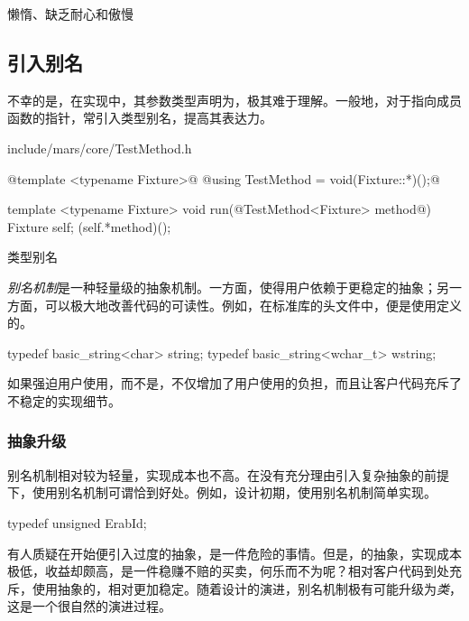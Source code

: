 \begin{content}
\begin{episode}{懒惰、缺乏耐心和傲慢}
\begin{content}
\end{content}
\end{episode}

\subsection{引入别名}

不幸的是，在实现中，其参数类型声明为，极其难于理解。一般地，对于指向成员函数的指针，常引入类型别名，提高其表达力。

\begin{nodiff}{include/mars/core/TestMethod.h}
\begin{c++}
@template <typename Fixture>@
@using TestMethod = void(Fixture::*)();@

template <typename Fixture>
void run(@TestMethod<Fixture> method@) {
  Fixture self;
  (self.*method)();
}
\end{c++}
\end{nodiff}

\begin{episode}{类型别名}
\begin{content}

\emph{别名机制}是一种轻量级的抽象机制。一方面，使得用户依赖于更稳定的抽象；另一方面，可以极大地改善代码的可读性。例如，在标准库的头文件中，便是使用定义的。

\begin{c++}[title={\ttfamily{标准库: std::string与std::wstring}}]
typedef basic_string<char> string;
typedef basic_string<wchar_t> wstring;
\end{c++}

如果强迫用户使用，而不是，不仅增加了用户使用的负担，而且让客户代码充斥了不稳定的实现细节。

\subsubsection{抽象升级}

别名机制相对较为轻量，实现成本也不高。在没有充分理由引入复杂抽象的前提下，使用别名机制可谓恰到好处。例如，设计初期，使用别名机制简单实现。

\begin{c++}[title={\ttfamily{设计初期}}]
typedef unsigned ErabId; 
\end{c++}

有人质疑在开始便引入过度的抽象，是一件危险的事情。但是，的抽象，实现成本极低，收益却颇高，是一件稳赚不赔的买卖，何乐而不为呢？相对客户代码到处充斥，使用抽象的，相对更加稳定。随着设计的演进，别名机制极有可能升级为\emph{类}，这是一个很自然的演进过程。


\end{content}
\end{episode}
\end{content}
